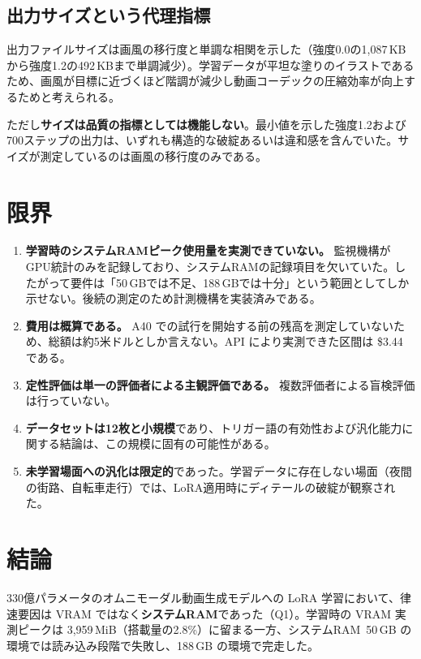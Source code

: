 \documentclass[10pt,twocolumn]{ltjsarticle}
\begin{document}
\subsection{出力サイズという代理指標}

出力ファイルサイズは画風の移行度と単調な相関を示した（強度0.0の1{,}087\,KBから強度1.2の492\,KBまで単調減少）。学習データが平坦な塗りのイラストであるため、画風が目標に近づくほど階調が減少し動画コーデックの圧縮効率が向上するためと考えられる。

ただし\textbf{サイズは品質の指標としては機能しない}。最小値を示した強度1.2および700ステップの出力は、いずれも構造的な破綻あるいは違和感を含んでいた。サイズが測定しているのは画風の移行度のみである。

\section{限界}

\begin{enumerate}[leftmargin=1.6em,topsep=2pt,itemsep=2pt]
  \item \textbf{学習時のシステムRAMピーク使用量を実測できていない。} 監視機構がGPU統計のみを記録しており、システムRAMの記録項目を欠いていた。したがって要件は「50\,GBでは不足、188\,GBでは十分」という範囲としてしか示せない。後続の測定のため計測機構を実装済みである。
  \item \textbf{費用は概算である。} A40 での試行を開始する前の残高を測定していないため、総額は約5米ドルとしか言えない。API により実測できた区間は \$3.44 である。
  \item \textbf{定性評価は単一の評価者による主観評価である。} 複数評価者による盲検評価は行っていない。
  \item \textbf{データセットは12枚と小規模}であり、トリガー語の有効性および汎化能力に関する結論は、この規模に固有の可能性がある。
  \item \textbf{未学習場面への汎化は限定的}であった。学習データに存在しない場面（夜間の街路、自転車走行）では、LoRA適用時にディテールの破綻が観察された。
\end{enumerate}

\section{結論}

330億パラメータのオムニモーダル動画生成モデルへの LoRA 学習において、律速要因は VRAM ではなく\textbf{システムRAM}であった（Q1）。学習時の VRAM 実測ピークは 3{,}959\,MiB（搭載量の2.8\%）に留まる一方、システムRAM~50\,GB の環境では読み込み段階で失敗し、188\,GB の環境で完走した。
\end{document}
